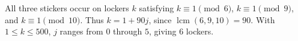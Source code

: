 All three stickers occur on lockers $k$ satisfying $k\equiv1\pmod6$, $k\equiv1\pmod9$, and $k\equiv1\pmod{10}$. Thus $k=1+90j$, since $\operatorname{lcm}(6,9,10)=90$. With $1\le k\le500$, $j$ ranges from 0 through $5$, giving $\boxed{6}$ lockers.
